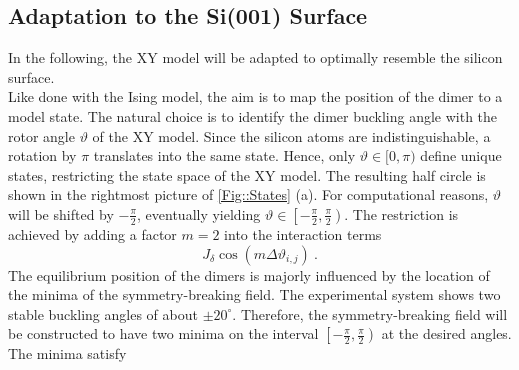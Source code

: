 	\subsection{Adaptation to the Si(001) Surface}\label{Sec::XY-to-Silicon}	
	In the following, the XY model will be adapted to optimally resemble the silicon surface. \\ 	%
	
	Like done with the Ising model, the aim is to map the position of the dimer to a model state. The natural choice is to identify the dimer buckling angle with the rotor angle $\vartheta$ of the XY model. Since the silicon atoms are indistinguishable, a rotation by $\pi$ translates into the same state. Hence, only $\vartheta \in [0, \pi)$ define unique states, restricting the state space of the XY model. The resulting half circle is shown in the rightmost picture of \autoref{Fig::States} (a). For computational reasons, $\vartheta $ will be shifted by $-\tfrac{\pi}{2}$, eventually yielding $\vartheta \in \left[-\tfrac{\pi}{2}, \tfrac{\pi}{2}\right)$. The restriction is achieved by adding a factor $m=2$ into the interaction terms 
	\begin{equation} \label{Eq::m-introduction}
		J_\delta \cos \left(m \Delta \vartheta_{i, j}\right)~.
	\end{equation}
	The equilibrium position of the dimers is majorly influenced by the location of the minima of the symmetry-breaking field. The experimental system shows two stable buckling angles of about $\pm 20^\circ$. Therefore, the symmetry-breaking field will be constructed to have two minima on the interval $\left[-\tfrac{\pi}{2}, \tfrac{\pi}{2}\right)$ at the desired angles. The minima satisfy
